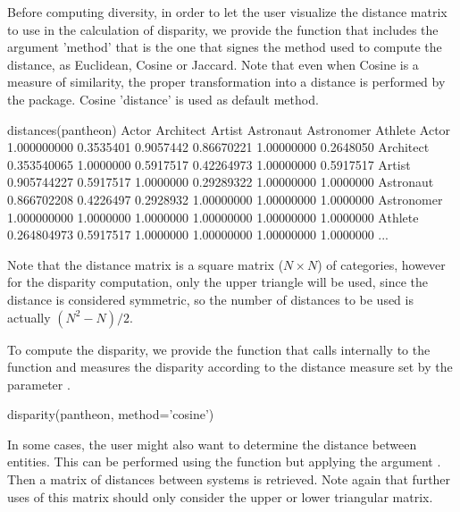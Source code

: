 Before computing diversity, in order to let the user visualize the distance matrix to use in the calculation of disparity, we provide the function  that includes the argument 'method' that is the one that signes the method used to compute the distance, as Euclidean, Cosine or Jaccard. Note that even when Cosine is a measure of similarity, the proper transformation into a distance is performed by the  package. Cosine 'distance' is used as default method.

\begin{example}
 distances(pantheon)
                          Actor Architect    Artist  Astronaut Astronomer   Athlete
Actor               1.000000000 0.3535401 0.9057442 0.86670221 1.00000000 0.2648050
Architect           0.353540065 1.0000000 0.5917517 0.42264973 1.00000000 0.5917517
Artist              0.905744227 0.5917517 1.0000000 0.29289322 1.00000000 1.0000000
Astronaut           0.866702208 0.4226497 0.2928932 1.00000000 1.00000000 1.0000000
Astronomer          1.000000000 1.0000000 1.0000000 1.00000000 1.00000000 1.0000000
Athlete             0.264804973 0.5917517 1.0000000 1.00000000 1.00000000 1.0000000
...
\end{example}

Note that the distance matrix is a square matrix ($N \times N$) of categories, however for the disparity computation, only the upper triangle will be used, since the distance is considered symmetric, so the number of distances to be used is actually $\left(N^2 - N\right)/2$.
 
To compute the disparity, we provide the function  that calls internally to the function  and measures the disparity according to the distance measure set by the parameter .

\begin{example}
   disparity(pantheon, method='cosine')
\end{example}


In some cases, the user might also want to determine the distance between entities. This can be performed using the function  but applying the argument . Then a matrix of distances between systems is retrieved. Note again that further uses of this matrix should only consider the upper or lower triangular matrix.


